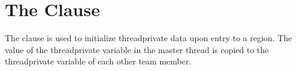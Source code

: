 \pagebreak
\chapter{The  Clause}
\label{chap:copyin}

The  clause is used to initialize threadprivate data upon entry 
to a  region. The value of the threadprivate variable in the master 
thread is copied to the threadprivate variable of each other team member.




